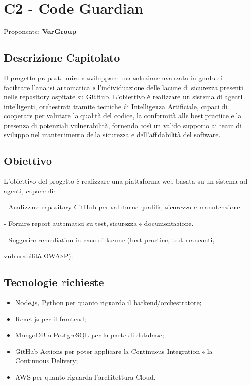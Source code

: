 \documentclass[a4paper,12pt]{article}
\begin{document}
\newpage

\section{C2 - Code Guardian}{
    Proponente: \textbf{VarGroup}
    \subsection*{Descrizione Capitolato}{
        Il progetto proposto mira a sviluppare una soluzione avanzata in grado di facilitare l'analisi automatica e l'individuazione delle lacune di sicurezza presenti nelle repository ospitate su GitHub.
        L'obiettivo è realizzare un sistema di agenti intelligenti, orchestrati tramite tecniche di Intelligenza Artificiale, capaci di cooperare per valutare la qualità del codice, la conformità alle best practice e la presenza di potenziali vulnerabilità, fornendo così un valido supporto ai team di sviluppo nel mantenimento della sicurezza e dell'affidabilità del software.
    }

    \subsection*{Obiettivo}{
        L'obiettivo del progetto è realizzare una piattaforma web basata su un sistema ad agenti, capace di: 
        
        - Analizzare repository GitHub per valutarne qualità, sicurezza e manutenzione.
        
        - Fornire report automatici su test, sicurezza e documentazione. 
        
        - Suggerire remediation in caso di lacune (best practice, test mancanti, 
        
        vulnerabilità OWASP).
    }

    \subsection*{Tecnologie richieste}{
        \begin{itemize}
            \item Node.js, Python per quanto riguarda il backend/orchestratore;
            \item React.js per il frontend;
            \item MongoDB o PostgreSQL per la parte di database;
            \item GitHub Actions per poter applicare la Continuous Integration e la Continuous Delivery;
            \item AWS per quanto riguarda l'architettura Cloud.
        \end{itemize}
    }   

}
\end{document}

